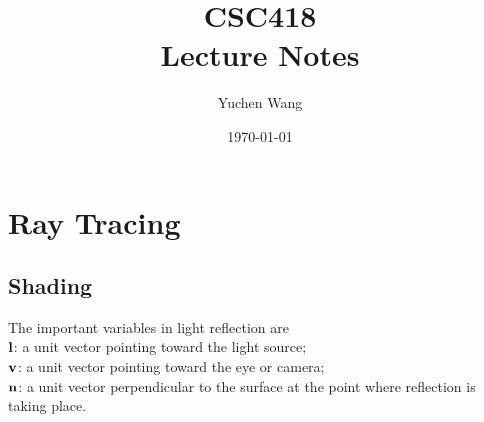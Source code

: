 \documentclass[11pt]{article}
\title{CSC418\\ Lecture Notes}
\author{Yuchen Wang}
\date{\today}
\begin{document}
    \maketitle
    \tableofcontents
    \newpage

\section{Ray Tracing}
\subsection{Shading \label{Shading}}
\notation
The important variables in light reflection are \\
 $\textbf{l}$: a unit vector pointing toward the light source;\\
 $\textbf{v}$: a unit vector pointing toward the eye or camera;\\
 $\textbf{n}$: a unit vector perpendicular to the surface at the point where reflection is taking place.
\end{document}

